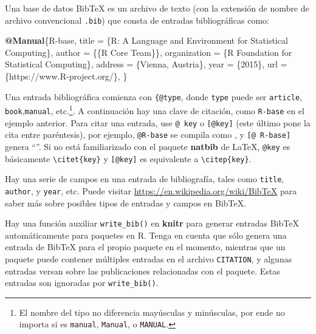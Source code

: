 \documentclass[12pt,]{krantz}
\makeatletter
\newenvironment{Shaded}{\begin{snugshade}}{\end{snugshade}}
\newcommand{\KeywordTok}[1]{\textcolor[rgb]{0.13,0.29,0.53}{\textbf{{#1}}}}
\newcommand{\DataTypeTok}[1]{\textcolor[rgb]{0.13,0.29,0.53}{{#1}}}
\newcommand{\OtherTok}[1]{\textcolor[rgb]{0.56,0.35,0.01}{{#1}}}
\newcommand{\NormalTok}[1]{{#1}}
\newenvironment{kframe}{%
\medskip{}
\setlength{\fboxsep}{.8em}
 \def\at@end@of@kframe{}%
 \ifinner\ifhmode%
  \def\at@end@of@kframe{\end{minipage}}%
  \begin{minipage}{\columnwidth}%
 \fi\fi%
 \def\FrameCommand##1{\hskip\@totalleftmargin \hskip-\fboxsep
 \colorbox{shadecolor}{##1}\hskip-\fboxsep
     \hskip-\linewidth \hskip-\@totalleftmargin \hskip\columnwidth}%
 \MakeFramed {\advance\hsize-\width
   \@totalleftmargin\z@ \linewidth\hsize
   \@setminipage}}%
 {\par\unskip\endMakeFramed%
 \at@end@of@kframe}
\renewenvironment{Shaded}{\begin{kframe}}{\end{kframe}}
\theoremstyle{definition}
\theoremstyle{definition}
\theoremstyle{remark}
\makeatother
\begin{document}
Una base de datos BibTeX es un archivo de texto (con la extensión de
nombre de archivo convencional \texttt{.bib}) que consta de entradas
bibliográficas como:

\begin{Shaded}
\begin{Highlighting}[]
\KeywordTok{@Manual}\NormalTok{\{}\OtherTok{R}\NormalTok{-}\OtherTok{base}\NormalTok{,}
  \DataTypeTok{title} \NormalTok{= \{R: A Language and Environment for Statistical Computing\},}
  \DataTypeTok{author} \NormalTok{= \{\{R Core Team\}\},}
  \DataTypeTok{organization} \NormalTok{= \{R Foundation for Statistical Computing\},}
  \DataTypeTok{address} \NormalTok{= \{Vienna, Austria\},}
  \DataTypeTok{year} \NormalTok{= \{2015\},}
  \DataTypeTok{url} \NormalTok{= \{https://www.R-project.org/\},}
\NormalTok{\}}
\end{Highlighting}
\end{Shaded}

Una entrada bibliográfica comienza con \texttt{\{@type}, donde
\texttt{type} puede ser \texttt{article}, \texttt{book},\texttt{manual},
etc.\footnote{El nombre del tipo no diferencia mayúsculas y minúsculas,
  por ende no importa si es \texttt{manual}, \texttt{Manual}, o
  \texttt{MANUAL}.}. A continuación hay una clave de citación, como
\texttt{R-base} en el ejemplo anterior. Para citar una entrada, use
\texttt{@\ key} o \texttt{{[}@key{]}} (este último pone la cita entre
paréntesis), por ejemplo, \texttt{@R-base} se compila como
\citet{R-base}, y \texttt{{[}@\ R-base{]}} genera ``\citep{R-base}''. Si
no está familiarizado con el paquete \textbf{natbib} de LaTeX,
\texttt{@key} es básicamente \texttt{\textbackslash{}citet\{key\}} y
\texttt{{[}@key{]}} es equivalente a
\texttt{\textbackslash{}citep\{key\}}.

Hay una serie de campos en una entrada de bibliografía, tales como
\texttt{title}, \texttt{author}, y \texttt{year}, etc. Puede visitar
\url{https://en.wikipedia.org/wiki/BibTeX} para saber más sobre posibles
tipos de entradas y campos en BibTeX.

Hay una función auxiliar \texttt{write\_bib()} en \textbf{knitr} para
generar entradas BibTeX automáticamente para paquetes en R. Tenga en
cuenta que sólo genera una entrada de BibTeX para el propio paquete en
el momento, mientras que un paquete puede contener múltiples entradas en
el archivo \texttt{CITATION}, y algunas entradas versan sobre las
publicaciones relacionadas con el paquete. Estas entradas son ignoradas
por \texttt{write\_bib()}.
\end{document}

